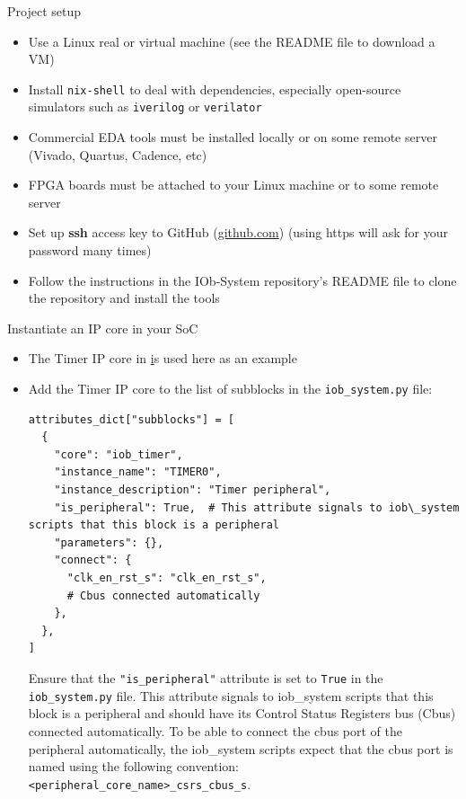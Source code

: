 \documentclass [xcolor=svgnames, t] {beamer}
\begin{document}
\begin{frame}{Project setup}
\begin{center}
  \begin{itemize}
  \item Use a Linux real or virtual machine (see the README file to download a VM)
    \item Install {\tt nix-shell} to deal with dependencies, especially open-source simulators such as {\tt iverilog} or {\tt verilator} 
    \item Commercial EDA tools must be installed locally or on some remote server (Vivado, Quartus, Cadence, etc) 
    \item FPGA boards must be attached to your Linux machine or to some remote server
    \item Set up {\bf ssh} access key to GitHub (\url{github.com}) (using https will ask for your password many times)
    \item Follow the instructions in the IOb-System repository's README file to clone the repository and install the tools
  \end{itemize}
\end{center}
\end{frame}


\begin{frame}[fragile]{Instantiate an IP core in your SoC}
  \begin{itemize}
  \item The Timer IP core in \href{https://github.com/IObundle/py2hwsw/tree/main/py2hwsw/lib/peripherals/iob_timer} is used here as an example
  \item Add the Timer IP core to the list of subblocks in the {\tt iob\_system.py} file:
    \begin{tiny}
      \begin{lstlisting}
attributes_dict["subblocks"] = [
  {
    "core": "iob_timer",
    "instance_name": "TIMER0",
    "instance_description": "Timer peripheral",
    "is_peripheral": True,  # This attribute signals to iob\_system scripts that this block is a peripheral
    "parameters": {},
    "connect": {
      "clk_en_rst_s": "clk_en_rst_s",
      # Cbus connected automatically
    },
  },
]
      \end{lstlisting}
      Ensure that the {\tt "is\_peripheral"} attribute is set to {\tt True} in the {\tt iob\_system.py} file. This attribute signals to iob\_system scripts that this block is a peripheral and should have its Control Status Registers bus (Cbus) connected automatically.
      To be able to connect the cbus port of the peripheral automatically, the iob\_system scripts expect that the cbus port is named using the following convention: {\tt <peripheral\_core\_name>\_csrs\_cbus\_s}.
    \end{tiny}
  \end{itemize}
\end{frame}
\end{document}
